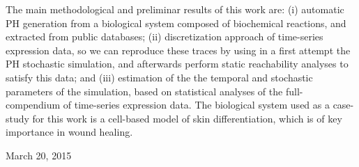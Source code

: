 The main methodological and preliminar results of this work are: (i) automatic PH generation 
from a biological system composed of biochemical reactions, and extracted from public databases;
(ii) discretization approach of time-series expression data, so we can 
reproduce these traces by using in a first attempt the PH stochastic simulation, and afterwards 
perform static reachability analyses to satisfy this data; and (iii) estimation of the the temporal and stochastic
parameters of the simulation, based on statistical analyses of the full-compendium of time-series expression data.
The biological system used as a case-study for this work is a cell-based model of skin differentiation, which 
is of key importance in  wound healing. 



 
\hfill March 20, 2015
